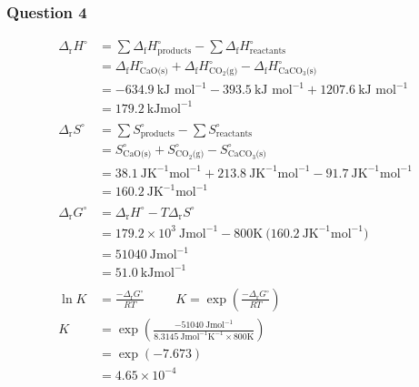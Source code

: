 \documentclass[11pt,a4paper]{article}
\begin{document}
\subsubsection*{Question 4}
	\begin{align*}
		\Delta_{\text{r}} H^\circ &= \sum \Delta_{\text{f}} H^\circ_{\text{products}} - \sum \Delta_{\text{f}} H^\circ_{\text{reactants}} \\
		&= \Delta_{\text{f}} H^\circ_{\text{CaO(s)}}+ \Delta_{\text{f}} H^\circ_{{\text{CO}}_{2} \text{(g)}} - \Delta_{\text{f}} H^\circ_{{\text{CaCO}}_{3} \text{(s)}} \\
		&= -634.9 \ \text{kJ mol}^{-1} - 393.5 \ \text{kJ mol}^{-1} + 1207.6 \ \text{kJ mol}^{-1} \\
		&= 179.2 \ \text{kJmol}^{-1} \\
		\\
		\Delta_{\text{r}} S^\circ &= \sum S^\circ_{\text{products}}  - \sum S^\circ_{\text{reactants}} \\
		&= S^\circ_{\text{CaO(s)}}+ S^\circ_{{\text{CO}}_{2} \text{(g)}} - S^\circ_{{\text{CaCO}}_{3} \text{(s)}} \\
		&= 38.1 \ \text{JK}^{-1} \text{mol}^{-1} + 213.8 \ \text{JK}^{-1} \text{mol}^{-1} - 91.7 \ \text{JK}^{-1} \text{mol}^{-1} \\
		&= 160.2 \ \text{JK}^{-1} \text{mol}^{-1} \\
		\\
		\Delta_{\text{r}} G^\circ &= \Delta_{\text{r}} H^\circ - T \Delta_{\text{r}} S^\circ \\
		&=  179.2 \times 10^3 \ \text{Jmol}^{-1} - 800 \text{K} \ \big(160.2 \ \text{JK}^{-1} \text{mol}^{-1} \big) \\
		&= 51040 \ \text{Jmol}^{-1} \\
		&= 51.0 \ \text{kJmol}^{-1} \\     
		\\
		\ln K &= \frac{-\Delta_{\text{r}} G^\circ}{RT}  \qquad \ \ K = \exp \left(\frac{-\Delta_{\text{r}} G^\circ}{RT} \right) \\
		K &= \exp \left(\frac{-51040 \ \text{Jmol}^{-1}}{8.3145 \ \text{Jmol}^{-1} \text{K}^{-1}\times 800 \text{K}} \right) \\
		&= \exp \left(-7.673 \right) \\
		&= 4.65 \times 10^{-4} \\
		\\

\end{align*}
\end{document}
